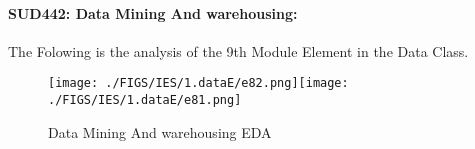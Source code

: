 \documentclass[12pt]{extreport}
\begin{document}
\begin{comment}
\subparagraph{Interpretation of the histogram:}

This Frequency Distribution is (Skeness) with the following descriptive statistics:


\begin{enumerate}
	\item Mean = a
	\item STD = 1.41
	\item Range = 17-11 = 6
	\item IQR = 16-15 = 1 
\end{enumerate}
\end{comment}


\paragraph{\large SUD442: Data Mining And warehousing:\\
}
The Folowing is the analysis of the 9th Module Element in the Data Class.

\begin{figure}[H]
	\centering
	\texttt{[image: ./FIGS/IES/1.dataE/e82.png]}\texttt{[image: ./FIGS/IES/1.dataE/e81.png]}
	\caption{Data Mining And warehousing EDA}
	\label{fig:14}
\end{figure}
\end{document}
